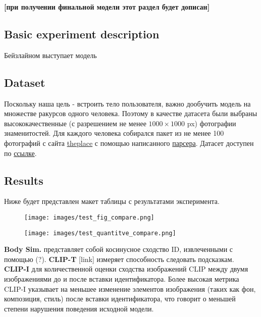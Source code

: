 \documentclass[a4paper,14pt]{article}
\theoremstyle{plain} %
\theoremstyle{definition} %
\theoremstyle{remark} %
\begin{document}
		\textbf{[при получении финальной модели этот раздел будет дописан]}

	\subsection{Basic experiment description}
		Бейзлайном выступает модель

	\subsection{Dataset}
		Поскольку наша цель - встроить тело пользователя, важно дообучить модель на множестве ракурсов одного человека.
		Поэтому в качестве датасета были выбраны высококачественные (с разрешением не менее $1000\times 1000$ px) фотографии знаменитостей. Для каждого человека собирался пакет из
		не менее 100 фотографий с сайта \href{https://www.theplace.ru/photos/}{theplace} с помощью написанного \href{https://github.com/wolkendolf/2025-project-DiffModels/tree/main/parser}{парсера}.
		Датасет доступен по \href{https://drive.google.com/drive/folders/1gP83US8DSw-OM0Fc1MlOYFVd0QJ7oJmy?usp=sharing}{ссылке}.

	\subsection{Results}
		Ниже будет представлен макет таблицы с результатами эксперимента.
		\begin{figure}[h]
			\centering
			\texttt{[image: images/test\_fig\_compare.png]} %
			\label{fig:test_fig_compare}
		\end{figure}

		\begin{figure}[h]
			\centering
			\texttt{[image: images/test\_quantitve\_compare.png]} %
			\label{fig:test_quantitve_compare}
		\end{figure}
		\textbf{Body Sim.} представляет собой косинусное сходство ID, извлеченными с помощью (?). \textbf{CLIP-T} [link] измеряет способность следовать подсказкам.
		\textbf{CLIP-I} для количественной оценки сходства изображений CLIP между двумя изображениями до и после вставки идентификатора.
		Более высокая метрика CLIP-I указывает на меньшее изменение элементов изображения (таких как фон, композиция, стиль) после вставки идентификатора,
		что говорит о меньшей степени нарушения поведения исходной модели.

	\nocite{*}
		
\end{document}
